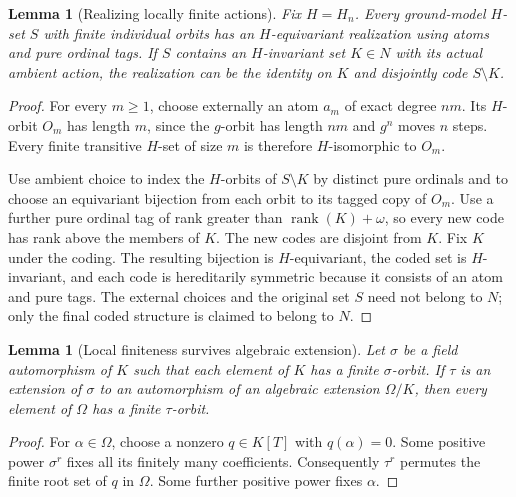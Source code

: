 \documentclass[11pt,a4paper]{article}
\newtheorem{lemma}[theorem]{Lemma}
\theoremstyle{definition}\newtheorem{definition}[theorem]{Definition}
\theoremstyle{remark}\newtheorem{remark}[theorem]{Remark}
\begin{document}
\begin{lemma}[Realizing locally finite actions]\label{lem:realize}
Fix $H=H_n$. Every ground-model $H$-set $S$ with finite individual orbits has an $H$-equivariant realization using atoms and pure ordinal tags. If $S$ contains an $H$-invariant set $K\in N$ with its actual ambient action, the realization can be the identity on $K$ and disjointly code $S\setminus K$.
\end{lemma}
\begin{proof}
For every $m\geq1$, choose externally an atom $a_m$ of exact degree $nm$. Its $H$-orbit $O_m$ has length $m$, since the $g$-orbit has length $nm$ and $g^n$ moves $n$ steps. Every finite transitive $H$-set of size $m$ is therefore $H$-isomorphic to $O_m$.

Use ambient choice to index the $H$-orbits of $S\setminus K$ by distinct pure ordinals and to choose an equivariant bijection from each orbit to its tagged copy of $O_m$. Use a further pure ordinal tag of rank greater than $\operatorname{rank}(K)+\omega$, so every new code has rank above the members of $K$. The new codes are disjoint from $K$. Fix $K$ under the coding. The resulting bijection is $H$-equivariant, the coded set is $H$-invariant, and each code is hereditarily symmetric because it consists of an atom and pure tags. The external choices and the original set $S$ need not belong to $N$; only the final coded structure is claimed to belong to $N$.
\end{proof}

\begin{lemma}[Local finiteness survives algebraic extension]\label{lem:lift}
Let $\sigma$ be a field automorphism of $K$ such that each element of $K$ has a finite $\sigma$-orbit. If $\tau$ is an extension of $\sigma$ to an automorphism of an algebraic extension $\Omega/K$, then every element of $\Omega$ has a finite $\tau$-orbit.
\end{lemma}
\begin{proof}
For $\alpha\in\Omega$, choose a nonzero $q\in K[T]$ with $q(\alpha)=0$. Some positive power $\sigma^r$ fixes all its finitely many coefficients. Consequently $\tau^r$ permutes the finite root set of $q$ in $\Omega$. Some further positive power fixes $\alpha$.
\end{proof}
\end{document}
